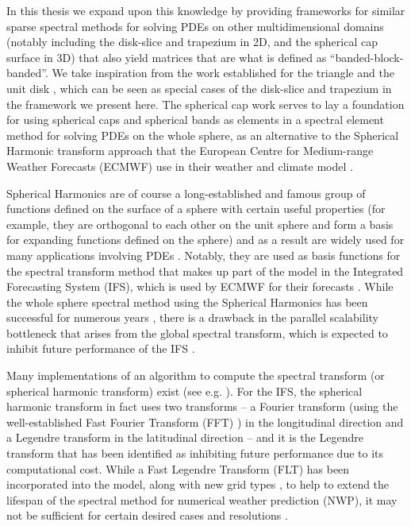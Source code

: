 In this thesis we expand upon this knowledge by providing frameworks for similar sparse spectral methods for solving PDEs on other multidimensional domains (notably including the disk-slice and trapezium in 2D, and the spherical cap surface in 3D) that also yield matrices that are what is defined as \enquote{banded-block-banded}. We take inspiration from the work established for the triangle \cite{olver2019triangle} and the unit disk \cite{vasil2016tensor}, which can  be seen as special cases of the disk-slice and trapezium in the framework we present here. The spherical cap work serves to lay a foundation for using spherical caps and spherical bands as elements in a spectral element method for solving PDEs on the whole sphere, as an alternative to the Spherical Harmonic transform approach that the European Centre for Medium-range Weather Forecasts (ECMWF) use in their weather and climate model \cite{cheong2006dynamical}.

Spherical Harmonics are of course a long-established and famous group of functions defined on the surface of a sphere with certain useful properties (for example, they are orthogonal to each other on the unit sphere and form a basis for expanding functions defined on the sphere) and as a result are widely used for many applications involving PDEs \cite{}. Notably, they are used as basis functions for the spectral transform method that makes up part of the model in the Integrated Forecasting System (IFS), which is used by ECMWF for their forecasts \cite{wedi2013fast}. While the whole sphere spectral method using the Spherical Harmonics has been successful for numerous years \cite{williamson2007evolution}, there is a drawback in the parallel scalability bottleneck that arises from the global spectral transform, which is expected to inhibit future performance of the IFS \cite{ecmwf2020scalability, wedi2013fast, diamantakisecmwf}. 

Many implementations of an algorithm to compute the spectral transform (or spherical harmonic transform) exist (see e.g. \cite{slevinsky2019fast, suda2002fast}). For the IFS, the spherical harmonic transform in fact uses two transforms -- a Fourier transform (using the well-established Fast Fourier Transform (FFT) \cite{cooley1965algorithm}) in the longitudinal direction and a Legendre transform in the latitudinal direction -- and it is the Legendre transform that has been identified as inhibiting future performance due to its computational cost. While a Fast Legendre Transform (FLT) \cite{wedi2013fast} has been incorporated into the model, along with new grid types \cite{malardel2016new}, to help to extend the lifespan of the spectral method for numerical weather prediction (NWP), it may not be sufficient for certain desired cases and resolutions \cite{diamantakisecmwf}. 

